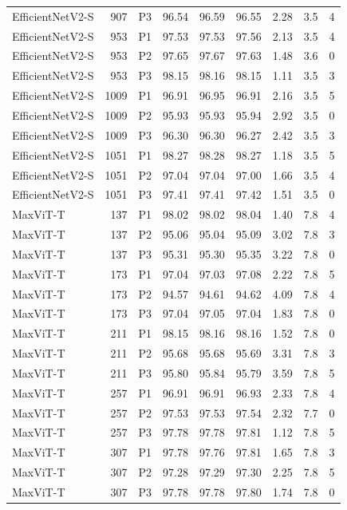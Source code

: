 {\begin{longtable}{lrlrrrrrr}
EfficientNetV2-S & 907 & P3 & 96.54 & 96.59 & 96.55 & 2.28 & 3.5 & 4 \\
EfficientNetV2-S & 953 & P1 & 97.53 & 97.53 & 97.56 & 2.13 & 3.5 & 4 \\
EfficientNetV2-S & 953 & P2 & 97.65 & 97.67 & 97.63 & 1.48 & 3.6 & 0 \\
EfficientNetV2-S & 953 & P3 & 98.15 & 98.16 & 98.15 & 1.11 & 3.5 & 3 \\
EfficientNetV2-S & 1009 & P1 & 96.91 & 96.95 & 96.91 & 2.16 & 3.5 & 5 \\
EfficientNetV2-S & 1009 & P2 & 95.93 & 95.93 & 95.94 & 2.92 & 3.5 & 0 \\
EfficientNetV2-S & 1009 & P3 & 96.30 & 96.30 & 96.27 & 2.42 & 3.5 & 3 \\
EfficientNetV2-S & 1051 & P1 & 98.27 & 98.28 & 98.27 & 1.18 & 3.5 & 5 \\
EfficientNetV2-S & 1051 & P2 & 97.04 & 97.04 & 97.00 & 1.66 & 3.5 & 4 \\
EfficientNetV2-S & 1051 & P3 & 97.41 & 97.41 & 97.42 & 1.51 & 3.5 & 0 \\
MaxViT-T & 137 & P1 & 98.02 & 98.02 & 98.04 & 1.40 & 7.8 & 4 \\
MaxViT-T & 137 & P2 & 95.06 & 95.04 & 95.09 & 3.02 & 7.8 & 3 \\
MaxViT-T & 137 & P3 & 95.31 & 95.30 & 95.35 & 3.22 & 7.8 & 0 \\
MaxViT-T & 173 & P1 & 97.04 & 97.03 & 97.08 & 2.22 & 7.8 & 5 \\
MaxViT-T & 173 & P2 & 94.57 & 94.61 & 94.62 & 4.09 & 7.8 & 4 \\
MaxViT-T & 173 & P3 & 97.04 & 97.05 & 97.04 & 1.83 & 7.8 & 0 \\
MaxViT-T & 211 & P1 & 98.15 & 98.16 & 98.16 & 1.52 & 7.8 & 0 \\
MaxViT-T & 211 & P2 & 95.68 & 95.68 & 95.69 & 3.31 & 7.8 & 3 \\
MaxViT-T & 211 & P3 & 95.80 & 95.84 & 95.79 & 3.59 & 7.8 & 5 \\
MaxViT-T & 257 & P1 & 96.91 & 96.91 & 96.93 & 2.33 & 7.8 & 4 \\
MaxViT-T & 257 & P2 & 97.53 & 97.53 & 97.54 & 2.32 & 7.7 & 0 \\
MaxViT-T & 257 & P3 & 97.78 & 97.78 & 97.81 & 1.12 & 7.8 & 5 \\
MaxViT-T & 307 & P1 & 97.78 & 97.76 & 97.81 & 1.65 & 7.8 & 3 \\
MaxViT-T & 307 & P2 & 97.28 & 97.29 & 97.30 & 2.25 & 7.8 & 5 \\
MaxViT-T & 307 & P3 & 97.78 & 97.78 & 97.80 & 1.74 & 7.8 & 0 \\

\end{longtable}}
